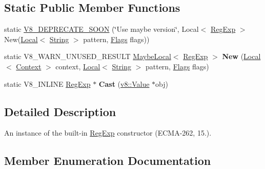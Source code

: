 \subsection*{Static Public Member Functions}
\begin{DoxyCompactItemize}
\item 
static \hyperlink{classv8_1_1RegExp_a9793a5a1e31b5ea0563d96d8c74c01ff}{V8\+\_\+\+D\+E\+P\+R\+E\+C\+A\+T\+E\+\_\+\+S\+O\+ON} (\char`\"{}Use maybe version\char`\"{}, Local$<$ \hyperlink{classv8_1_1RegExp}{Reg\+Exp} $>$ New(\hyperlink{classv8_1_1Local}{Local}$<$ \hyperlink{classv8_1_1String}{String} $>$ pattern,                                                                                                                                                                           \hyperlink{classv8_1_1RegExp_aa4718a5c1f18472aff3bf51ed694fc5a}{Flags} flags))
\item 
static V8\+\_\+\+W\+A\+R\+N\+\_\+\+U\+N\+U\+S\+E\+D\+\_\+\+R\+E\+S\+U\+LT \hyperlink{classv8_1_1MaybeLocal}{Maybe\+Local}$<$ \hyperlink{classv8_1_1RegExp}{Reg\+Exp} $>$ {\bfseries New} (\hyperlink{classv8_1_1Local}{Local}$<$ \hyperlink{classv8_1_1Context}{Context} $>$ context, \hyperlink{classv8_1_1Local}{Local}$<$ \hyperlink{classv8_1_1String}{String} $>$ pattern, \hyperlink{classv8_1_1RegExp_aa4718a5c1f18472aff3bf51ed694fc5a}{Flags} flags)\hypertarget{classv8_1_1RegExp_a805f632fe98d58160773a4ba1e424b15}{}\label{classv8_1_1RegExp_a805f632fe98d58160773a4ba1e424b15}

\item 
static V8\+\_\+\+I\+N\+L\+I\+NE \hyperlink{classv8_1_1RegExp}{Reg\+Exp} $\ast$ {\bfseries Cast} (\hyperlink{classv8_1_1Value}{v8\+::\+Value} $\ast$obj)\hypertarget{classv8_1_1RegExp_ac06d8f61c0ebb2e7292e6aeff7108f26}{}\label{classv8_1_1RegExp_ac06d8f61c0ebb2e7292e6aeff7108f26}

\end{DoxyCompactItemize}


\subsection{Detailed Description}
An instance of the built-\/in \hyperlink{classv8_1_1RegExp}{Reg\+Exp} constructor (E\+C\+M\+A-\/262, 15.). 

\subsection{Member Enumeration Documentation}

